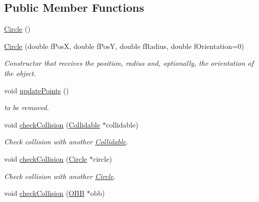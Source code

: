 \subsection*{Public Member Functions}
\begin{DoxyCompactItemize}
\item 
\hyperlink{class_circle_ad1ecfcfc7bf34529c6a6d6c448bf70fe}{Circle} ()
\item 
\hypertarget{class_circle_acb8056897b38fd437422c2c101950da2}{}\hyperlink{class_circle_acb8056897b38fd437422c2c101950da2}{Circle} (double f\+Pos\+X, double f\+Pos\+Y, double f\+Radius, double f\+Orientation=0)\label{class_circle_acb8056897b38fd437422c2c101950da2}

\begin{DoxyCompactList}\small\item\em Constructor that receives the position, radius and, optionally, the orientation of the object. \end{DoxyCompactList}\item 
\hypertarget{class_circle_afe23c30a1bbc5e831b72063aef91b38f}{}void \hyperlink{class_circle_afe23c30a1bbc5e831b72063aef91b38f}{update\+Points} ()\label{class_circle_afe23c30a1bbc5e831b72063aef91b38f}

\begin{DoxyCompactList}\small\item\em to be removed. \end{DoxyCompactList}\item 
\hypertarget{class_circle_a7b23c1ed107b8a309fc1c5d0f6635ae9}{}void \hyperlink{class_circle_a7b23c1ed107b8a309fc1c5d0f6635ae9}{check\+Collision} (\hyperlink{class_collidable}{Collidable} $\ast$collidable)\label{class_circle_a7b23c1ed107b8a309fc1c5d0f6635ae9}

\begin{DoxyCompactList}\small\item\em Check collision with another \hyperlink{class_collidable}{Collidable}. \end{DoxyCompactList}\item 
\hypertarget{class_circle_ad528dfc586b5a46b11401abf52d8da87}{}void \hyperlink{class_circle_ad528dfc586b5a46b11401abf52d8da87}{check\+Collision} (\hyperlink{class_circle}{Circle} $\ast$circle)\label{class_circle_ad528dfc586b5a46b11401abf52d8da87}

\begin{DoxyCompactList}\small\item\em Check collision with another \hyperlink{class_circle}{Circle}. \end{DoxyCompactList}\item 
\hypertarget{class_circle_a328f1400d819209db7b64431b60bbc59}{}void \hyperlink{class_circle_a328f1400d819209db7b64431b60bbc59}{check\+Collision} (\hyperlink{class_o_b_b}{O\+B\+B} $\ast$obb)\label{class_circle_a328f1400d819209db7b64431b60bbc59}


\end{DoxyCompactItemize}
